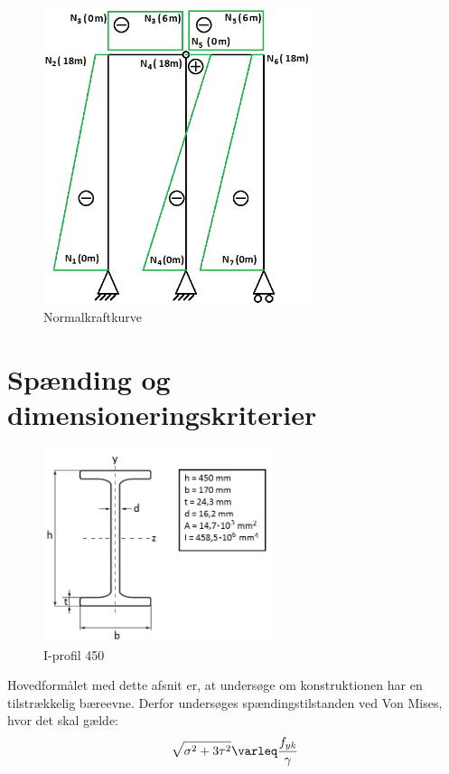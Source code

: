 \begin{figure}[H]
	\centering
	\includegraphics[width=0.7\textwidth]{billeder/SKFN.png}
	\caption{Normalkraftkurve}
	\label{fig:normalkraftkurve}
\end{figure}

\section{Spænding og dimensioneringskriterier}

\begin{figure}[H]
	\centering
	\includegraphics[width=0.6\textwidth]{billeder/iprofil.png}
	\caption{I-profil 450}
	\label{fig:iprofil}
\end{figure}

Hovedformålet med dette afsnit er, at undersøge om konstruktionen har en tilstrækkelig bæreevne. Derfor undersøges spændingstilstanden ved Von Mises, hvor det skal gælde: 
\begin{equation}
	\sqrt{\sigma^2 + 3\tau^2} \varleq \frac{f_{yk}}{\gamma}
\end{equation}


